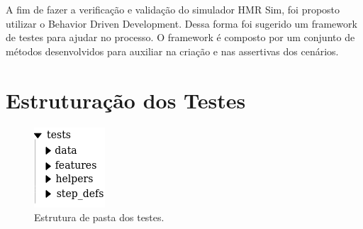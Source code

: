 \label{chapter:testsBdd}

A fim de fazer a verificação e validação do simulador HMR Sim, foi proposto utilizar o Behavior Driven Development. Dessa forma foi sugerido um framework de testes para ajudar no processo. O framework é composto por um conjunto de métodos desenvolvidos para auxiliar na criação e nas assertivas dos cenários.

\section{Estruturação dos Testes}
\label{sec:estruturacaoTestes}
\begin{figure}
\centering
\includegraphics[scale=0.8]{imagens/estrutura_pasta.png}
\caption{Estrutura de pasta dos testes.} 
\label{fig:estruturaPasta}
\end{figure}

